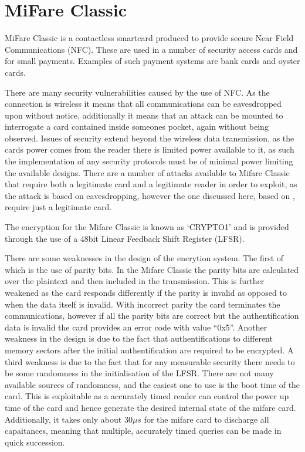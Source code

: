 \section{MiFare Classic}

MiFare Classic is a contactless smartcard produced to provide secure Near Field Communications (NFC).
These are used in a number of security access cards and for small payments.
Examples of such payment systems are bank cards and oyster cards.

There are many security vulnerabilities caused by the use of NFC.
As the connection is wireless it means that all communications can be eavesdropped upon without notice, additionally it means that an attack can be mounted to interrogate a card contained inside someones pocket, again without being observed.
Issues of security extend beyond the wireless data transmission, as the cards power comes from the reader there is limited power available to it, as such the implementation of any security protocols must be of minimal power limiting the available designs.
There are a number of attacks available to Mifare Classic that require both a legitimate card and a legitimate reader in order to exploit, as the attack is based on eavesdropping, however the one discussed here, based on \cite{WirelessPickpocket}, require just a legitimate card.

The encryption for the Mifare Classic is known as `CRYPTO1' and is provided through the use of a 48bit Linear Feedback Shift Register (LFSR).

There are some weaknesses in the design of the encrytion system.
The first of which is the use of parity bits.
In the Mifare Classic the parity bits are calculated over the plaintext and then included in the transmission.
This is further weakened as the card responds differently if the parity is invalid as opposed to when the data itself is invalid.
With incorrect parity the card terminates the communications, however if all the parity bits are correct but the authentification data is invalid the card provides an error code with value ``0x5''.
Another weakness in the design is due to the fact that authentifications to different memory sectors after the initial authentification are required to be encrypted.
A third weakness is due to the fact that for any measurable security there needs to be some randomness in the initialisation of the LFSR.
There are not many available sources of randomness, and the easiest one to use is the boot time of the card.
This is exploitable as a accurately timed reader can control the power up time of the card and hence generate the desired internal state of the mifare card.
Additionally, it takes only about $30\mu s$ for the mifare card to discharge all capaitances, meaning that multiple, accurately timed queries can be made in quick succession.

